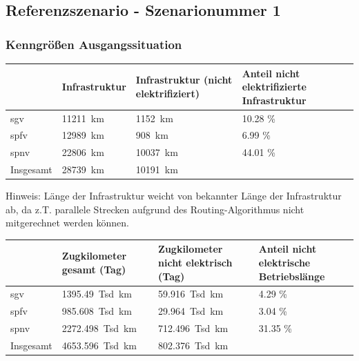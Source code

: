 \subsection{Referenzszenario - Szenarionummer 1}\label{chap_kenngrößen_s_1}

\subsubsection{Kenngrößen Ausgangssituation}
\begin{center}
	\begin{tabularx}{\textwidth}{l | X | X | X} & Infrastruktur & Infrastruktur (nicht elektrifiziert) & Anteil nicht elektrifizierte Infrastruktur \\
	\hline
	\acrshort{sgv} & \SI{11211}{\km} & \SI{1152}{\km} & \num{10.28} \% \\
	\acrshort{spfv} & \SI{12989}{\km} & \SI{908}{\km} & \num{6.99} \% \\
	\acrshort{spnv} & \SI{22806}{\km} & \SI{10037}{\km} & \num{44.01} \% \\
	\hline
	Insgesamt & \SI{28739}{\km} & \SI{10191}{\km} & \\
	\end{tabularx}
\end{center}
\hspace{2em}

Hinweis: Länge der Infrastruktur weicht von bekannter Länge der Infrastruktur ab, da z.T. parallele Strecken aufgrund des Routing-Algorithmus nicht mitgerechnet werden können.

\begin{center}
	\begin{tabularx}{\textwidth}{l | X | X | X} & Zugkilometer gesamt (Tag) & Zugkilometer nicht elektrisch (Tag) & Anteil nicht elektrische Betriebslänge \\
	\hline
	\acrshort{sgv} & \SI{1395.49}{Tsd. \km} & \SI{59.916}{Tsd. \km} & \num{4.29}  \% \\
	\acrshort{spfv} & \SI{985.608}{Tsd. \km} & \SI{29.964}{Tsd. \km} & \num{3.04} \% \\
	\acrshort{spnv} & \SI{2272.498}{Tsd. \km} & \SI{712.496}{Tsd. \km} & \num{31.35} \% \\
	\hline
	Insgesamt & \SI{4653.596}{Tsd. \km} & \SI{802.376}{Tsd. \km} & \\
	\end{tabularx}
\end{center}



